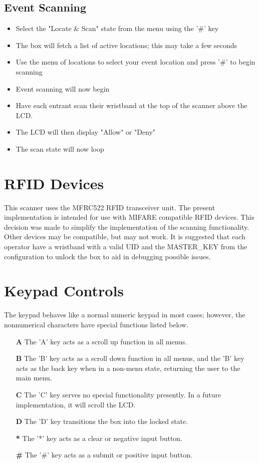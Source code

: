 \documentclass{article}
\begin{document}
\subsection{Event Scanning}
\begin{itemize}
	\item Select the "Locate \& Scan" state from the menu using the '\#' key
	\item The box will fetch a list of active locations; this may take a few seconds
	\item Use the menu of locations to select your event location and press '\#' to begin scanning
	\item Event scanning will now begin
	\item Have each entrant scan their wristband at the top of the scanner above the LCD.  
	\item The LCD will then display "Allow" or "Deny"
	\item The scan state will now loop
\end{itemize}

\section{RFID Devices}
This scanner uses the MFRC522 RFID transceiver unit. The present implementation is intended for use with MIFARE compatible RFID devices.  This decision was made to simplify the implementation of the scanning functionality.  Other devices may be compatible, but may not work.  It is suggested that each operator have a wristband with a valid UID and the MASTER\_KEY from the configuration to unlock the box to aid in debugging possible issues.

\section{Keypad Controls}
The keypad behaves like a normal numeric keypad in most cases; however, the nonnumerical characters have special functions listed below.  
\begin{itemize}
	\item[\textbf{A}] The 'A' key acts as a scroll up function in all menus.
	\item[\textbf{B}] The 'B' key acts as a scroll down function in all menus, and the 'B' key acts as the back key when in a non-menu state, returning the user to the main menu.
	\item[\textbf{C}] The 'C' key serves no special functionality presently.  In a future implementation, it will scroll the LCD.
	\item[\textbf{D}] The 'D' key transitions the box into the locked state.
	\item[\textbf{*}] The '*' key acts as a clear or negative input button.  
	\item[\textbf{\#}] The '\#' key acts as a submit or positive input button.
\end{itemize}
\end{document}
